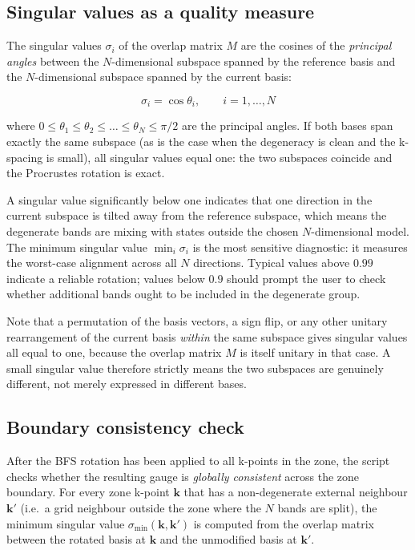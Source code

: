 \documentclass[a4paper,12pt]{report}
\begin{document}
\subsection*{Singular values as a quality measure}

The singular values $\sigma_i$ of the overlap matrix $M$ are the cosines of
the \emph{principal angles} \cite{Bjorck1973} between the $N$-dimensional
subspace spanned by the reference basis and the $N$-dimensional subspace
spanned by the current basis:

\begin{equation}
  \sigma_i = \cos\theta_i, \qquad i = 1, \ldots, N
\end{equation}

where $0 \le \theta_1 \le \theta_2 \le \ldots \le \theta_N \le \pi/2$ are
the principal angles.
If both bases span exactly the same subspace (as is the case when the
degeneracy is clean and the k-spacing is small), all singular values equal
one: the two subspaces coincide and the Procrustes rotation is exact.

A singular value significantly below one indicates that one direction in the
current subspace is tilted away from the reference subspace, which means the
degenerate bands are mixing with states outside the chosen $N$-dimensional
model.
The minimum singular value $\min_i\sigma_i$ is the most sensitive diagnostic:
it measures the worst-case alignment across all $N$ directions.
Typical values above $0.99$ indicate a reliable rotation; values below $0.9$
should prompt the user to check whether additional bands ought to be included
in the degenerate group.

Note that a permutation of the basis vectors, a sign flip, or any other
unitary rearrangement of the current basis \emph{within} the same subspace
gives singular values all equal to one, because the overlap matrix $M$ is
itself unitary in that case.
A small singular value therefore strictly means the two subspaces are
genuinely different, not merely expressed in different bases.


\subsection*{Boundary consistency check}

After the BFS rotation has been applied to all k-points in the zone, the
script checks whether the resulting gauge is \emph{globally consistent} across
the zone boundary.
For every zone k-point $\pmb{k}$ that has a non-degenerate external neighbour
$\pmb{k}'$ (i.e.\ a grid neighbour outside the zone where the $N$ bands are
split), the minimum singular value $\sigma_{\min}(\pmb{k},\pmb{k}')$ is
computed from the overlap matrix between the rotated basis at $\pmb{k}$ and
the unmodified basis at $\pmb{k}'$.
\end{document}
